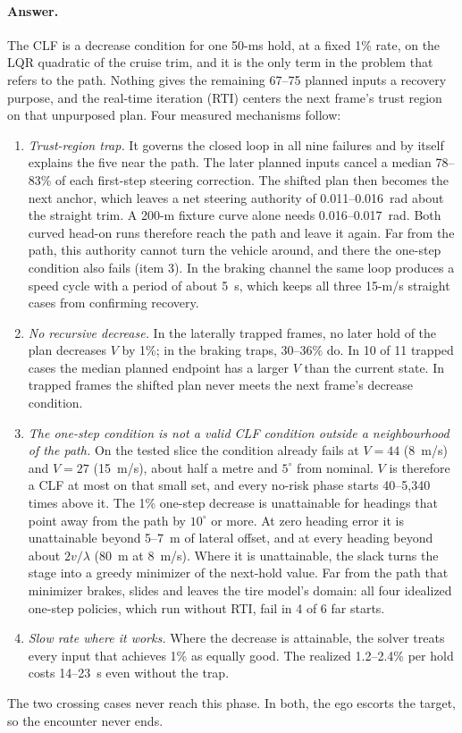 \documentclass[11pt]{article}
\begin{document}
\paragraph{Answer.} The CLF is a decrease condition for one 50-ms hold, at a
fixed 1\% rate, on the LQR quadratic of the cruise trim, and it is the only
term in the problem that refers to the path. Nothing gives the remaining 67--75
planned inputs a recovery purpose, and the real-time iteration (RTI) centers
the next frame's trust region on that unpurposed plan. Four measured
mechanisms follow:
\begin{enumerate}
\item \emph{Trust-region trap.} It governs the closed loop in all nine failures
and by itself explains the five near the path. The later planned
inputs cancel a median 78--83\% of each first-step steering correction. The
shifted plan then becomes the next anchor, which leaves a net steering
authority of 0.011--0.016~rad about the straight trim. A 200-m fixture curve
alone needs 0.016--0.017~rad. Both curved head-on runs therefore reach the path
and leave it again. Far from the path, this authority cannot turn the vehicle
around, and there the one-step condition also fails (item 3). In the braking channel the same loop produces a speed cycle with a
period of about 5~s, which keeps all three 15-m/s straight cases from
confirming recovery.
\item \emph{No recursive decrease.} In the laterally trapped frames, no later
hold of the plan decreases $V$ by 1\%; in the braking traps, 30--36\% do. In 10
of 11 trapped cases the median planned endpoint has a larger $V$ than the
current state. In trapped frames the shifted plan never meets the next frame's
decrease condition.
\item \emph{The one-step condition is not a valid CLF condition outside a
neighbourhood of the path.} On the tested slice the condition already fails at
$V=44$ (8~m/s) and $V=27$ (15~m/s), about half a metre and $5^\circ$ from
nominal. $V$ is therefore a CLF at most on that small set, and every no-risk
phase starts 40--5{,}340 times above it. The 1\% one-step decrease is
unattainable for headings that point away from the path by $10^\circ$ or more. At zero heading
error it is unattainable beyond 5--7~m of lateral offset, and at every heading beyond about
$2v/\lambda$ (80~m at 8~m/s). Where it is unattainable, the slack turns the
stage into a greedy minimizer of the next-hold value. Far from the path that
minimizer brakes, slides and leaves the tire model's domain: all four idealized
one-step policies, which run without RTI, fail in 4 of 6 far starts.
\item \emph{Slow rate where it works.} Where the decrease is attainable, the
solver treats every input that achieves 1\% as equally good. The realized
1.2--2.4\% per hold costs 14--23~s even without the trap.
\end{enumerate}
The two crossing cases never reach this phase. In both, the ego escorts the
target, so the encounter never ends.
\end{document}
